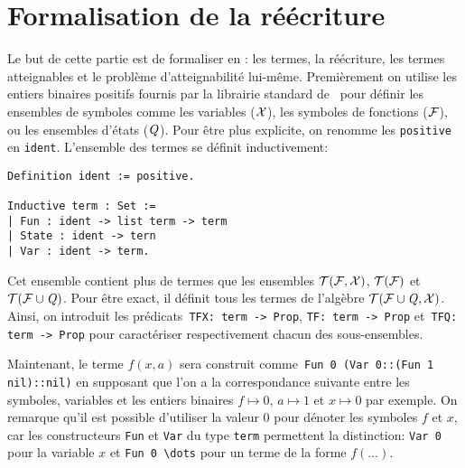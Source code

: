 \section{Formalisation de la réécriture}
\label{sec:rewriting}

Le but de cette partie est de formaliser en \coq: les termes, la
réécriture, les termes atteignables et le problème d'atteignabilité
lui-même.  Premièrement on utilise les entiers binaires positifs
fournis par la librairie standard de \coq\ pour définir les ensembles de
symboles comme les variables ($\mathcal X$), les symboles de fonctions
($\mathcal{F}$), ou les ensembles d'états ($\mathit Q$). 
Pour être plus explicite, on renomme les \lstinline!positive!
en \lstinline!ident!. L'ensemble des termes se définit inductivement:

\switchlstcoq
\begin{lstlisting}
Definition ident := positive.

Inductive term : Set :=
| Fun : ident -> list term -> term
| State : ident -> tern
| Var : ident -> term.
\end{lstlisting}

Cet ensemble contient plus de termes que les ensembles $\mathcal{T(F, X)}$, $\mathcal{T(F)}$ et $\mathcal{ T(F \cup \mathit Q)}$.
Pour être exact, il définit tous les termes de l'algèbre $\mathcal{ T(F \cup \mathit Q, X)}$.
Ainsi, on introduit les prédicats~\lstinline!TFX: term -> Prop!, \lstinline!TF: term -> Prop!
et~\lstinline!TFQ: term -> Prop! pour caractériser respectivement chacun des sous-ensembles.

Maintenant, le terme $f(x, a)$ sera construit comme~\lstinline!Fun 0 (Var 0::(Fun 1 nil)::nil)!
en supposant que l'on a la correspondance suivante entre les symboles,
variables et les entiers binaires $f \mapsto 0$, $a \mapsto 1$ et $x
\mapsto 0$ par exemple.  On remarque qu'il est possible d'utiliser 
la valeur $0$ pour dénoter les symboles $f$ et $x$, car les constructeurs
\lstinline!Fun! et \lstinline!Var! du type \lstinline!term! permettent la distinction:
\lstinline!Var 0! pour la variable $x$ et \lstinline!Fun 0 \dots! pour un terme de la forme $f(\dots)$.

